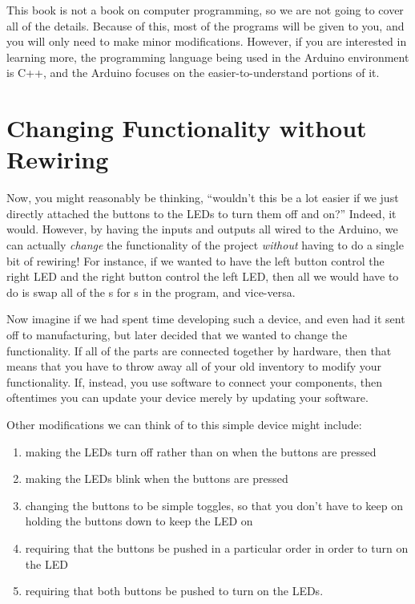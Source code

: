 This book is not a book on computer programming, so we are not going to cover all of the details.
Because of this, most of the programs will be given to you, and you will only need to make minor modifications.
However, if you are interested in learning more, the programming language being used in the Arduino environment is C++, and the Arduino focuses on the easier-to-understand portions of it.

\section{Changing Functionality without Rewiring}

Now, you might reasonably be thinking, ``wouldn't this be a lot easier if we just directly attached the buttons to the LEDs to turn them off and on?''
Indeed, it would. 
However, by having the inputs and outputs all wired to the Arduino, we can actually \emph{change} the functionality of the project \emph{without} having to do a single bit of rewiring!
For instance, if we wanted to have the left button control the right LED and the right button control the left LED, then all we would have to do is swap all of the s for s in the program, and vice-versa.

Now imagine if we had spent time developing such a device, and even had it sent off to manufacturing, but later decided that we wanted to change the functionality.
If all of the parts are connected together by hardware, then that means that you have to throw away all of your old inventory to modify your functionality.
If, instead, you use software to connect your components, then oftentimes you can update your device merely by updating your software.

Other modifications we can think of to this simple device might include:
\begin{enumerate}
\item making the LEDs turn off rather than on when the buttons are pressed
\item making the LEDs blink when the buttons are pressed
\item changing the buttons to be simple toggles, so that you don't have to keep on holding the buttons down to keep the LED on
\item requiring that the buttons be pushed in a particular order in order to turn on the LED
\item requiring that both buttons be pushed to turn on the LEDs.
\end{enumerate}

